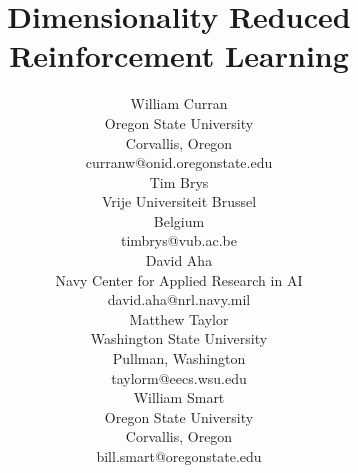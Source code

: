 \documentclass[10pt,a4paper]{article}
\begin{document}

\title{Dimensionality Reduced Reinforcement Learning}
\author{
William Curran \\
Oregon State University \\
Corvallis, Oregon \\
curranw@onid.oregonstate.edu \\
\And
Tim Brys \\
Vrije Universiteit Brussel \\
Belgium \\
timbrys@vub.ac.be \\
\And
David Aha \\
Navy Center for Applied Research in AI \\
david.aha@nrl.navy.mil \\
\AND
Matthew Taylor \\
Washington State University \\ 
Pullman, Washington \\
taylorm@eecs.wsu.edu \\
\And
William Smart \\
Oregon State University \\
Corvallis, Oregon \\
bill.smart@oregonstate.edu
}
 
\end{document}

